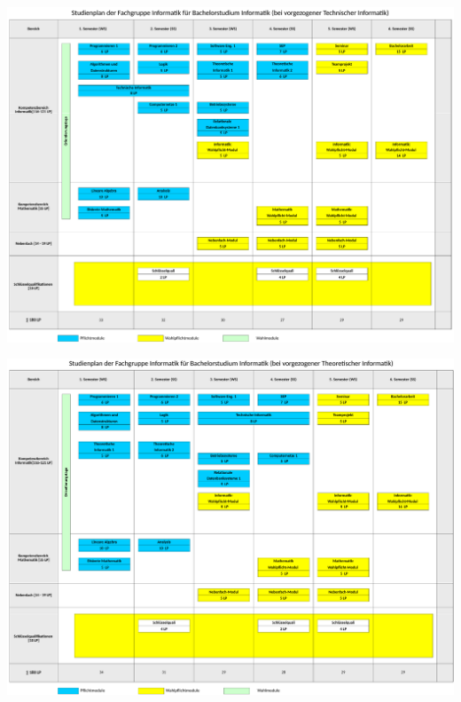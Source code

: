 \documentclass[]{papertex}
\begin{document}
		\newpage
		\begin{minipage}[H]{1.0\linewidth}
		\begin{center} 
  			\includegraphics[angle=90, height=\textheight, width=\textwidth ]{bilder/studienplan_bsc_ws/ws2015/BScInformatikWS1516-fginfo-tech_scissored}
  			\label{studienplan_tech}
		\end{center}
		\end{minipage}
		\newpage
		\begin{minipage}[H]{1.0\linewidth}
		\begin{center} 
  			\includegraphics[angle=90, totalheight=\textheight, width=\textwidth ]{bilder/studienplan_bsc_ws/ws2015/BScInformatikWS1516-fginfo-theo_scissored}
  			\label{studienplan_theo}
		\end{center}
		\end{minipage}
	
	
	\newpage
\end{document}
